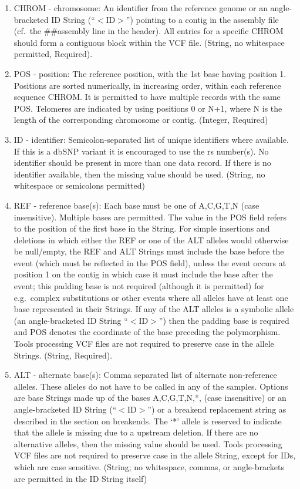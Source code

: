 \documentclass[8pt]{article}
\begin{document}
\begin{enumerate}
  \item CHROM - chromosome: An identifier from the reference genome or an angle-bracketed ID String (``$<$ID$>$'') pointing to a contig in the assembly file (cf.\ the \#\#assembly line in the header). All entries for a specific CHROM should form a contiguous block within the VCF file. (String, no whitespace permitted, Required).
  \item POS - position: The reference position, with the 1st base having position 1. Positions are sorted numerically, in increasing order, within each reference sequence CHROM.   It is permitted to have multiple records with the same POS. Telomeres are indicated by using positions 0 or N+1, where N is the length of the corresponding chromosome or contig.   (Integer, Required)
  \item ID - identifier: Semicolon-separated list of unique identifiers where available. If this is a dbSNP variant it is encouraged to use the rs number(s). No identifier should be present in more than one data record. If there is no identifier available, then the missing value should be used. (String, no whitespace or semicolons permitted)
  \item REF - reference base(s): Each base must be one of A,C,G,T,N (case insensitive). Multiple bases are permitted. The value in the POS field refers to the position of the first base in the String. For simple insertions and deletions in which either the REF or one of the ALT alleles would otherwise be null/empty, the REF and ALT Strings must include the base before the event (which must be reflected in the POS field), unless the event occurs at position 1 on the contig in which case it must include the base after the event; this padding base is not required (although it is permitted) for e.g.\ complex substitutions or other events where all alleles have at least one base represented in their Strings.  If any of the ALT alleles is a symbolic allele (an angle-bracketed ID String ``$<$ID$>$'') then the padding base is required and POS denotes the coordinate of the base preceding the polymorphism. Tools processing VCF files are not required to preserve case in the allele Strings. (String, Required).
  \item ALT - alternate base(s): Comma separated list of alternate non-reference alleles.  These alleles do not have to be called in any of the samples. Options are base Strings made up of the bases A,C,G,T,N,*, (case insensitive) or an angle-bracketed ID String (``$<$ID$>$'') or a breakend replacement string as described in the section on breakends. The `*' allele is reserved to indicate that the allele is missing due to a upstream deletion. If there are no alternative alleles, then the missing value should be used.  Tools processing VCF files are not required to preserve case in the allele String, except for IDs, which are case sensitive.  (String; no whitespace, commas, or angle-brackets are permitted in the ID String itself)

\end{enumerate}
\end{document}
